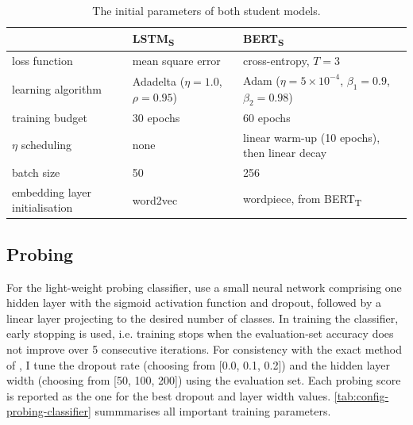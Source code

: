 \documentclass[bsc,frontabs,singlespacing,parskip,deptreport]{infthesis}
\def\BERTT{BERT\textsubscript{T}}
\def\BERTS{BERT\textsubscript{S}}
\def\LSTMS{LSTM\textsubscript{S}}
\begin{document}
{{{      \begin{table}[h!tb]
      \centering
      \footnotesize
      \begin{tabular}{P{0.18\textwidth} m{0.3\textwidth} m{0.3\textwidth} }
      \toprule
      & \LSTMS & \BERTS \\
      \toprule
      loss function & mean square error & cross-entropy, $T=3$ \\
      \hline
      learning algorithm & Adadelta ($\eta=1.0$, $\rho=0.95$) &  Adam ($\eta=5\times10^{-4}$, $\beta_1=0.9$, $\beta_2=0.98$) \\
      \hline
      training budget & 30 epochs & 60 epochs \\
      \hline
      $\eta$ scheduling & none & linear warm-up (10 epochs), then linear decay \\
      \hline
      batch size & 50 & 256 \\
      \hline
      embedding layer initialisation & word2vec & wordpiece, from \BERTT \\
      \bottomrule
      \end{tabular}
      \caption{The initial parameters of both student models.}
      \label{tab:initial-configs}
      \end{table}
    }

    \subsection{Probing}{
      \label{sec:implementation-details-probing}
      For the light-weight probing classifier, \citet{Conneau_2018} use a small neural network comprising one hidden layer with the sigmoid activation function and dropout, followed by a linear layer projecting to the desired number of classes. 
      In training the classifier, early stopping is used, i.e. training stops when the evaluation-set accuracy does not improve over 5 consecutive iterations.
      For consistency with the exact method of \citeauthor{Conneau_2018}, I tune the dropout rate (choosing from [0.0, 0.1, 0.2]) and the hidden layer width (choosing from [50, 100, 200]) using the evaluation set. Each probing score is reported as the one for the best dropout and layer width values.
      \autoref{tab:config-probing-classifier} summmarises all important training parameters.

}}}
\end{document}
